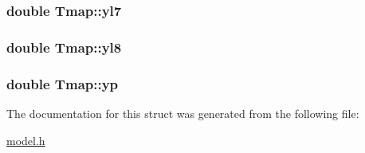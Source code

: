 \subsubsection[{\texorpdfstring{yl7}{yl7}}]{\setlength{\rightskip}{0pt plus 5cm}double Tmap\+::yl7}\hypertarget{struct_tmap_a096b97170b08fa99f2692695a6775e35}{}\label{struct_tmap_a096b97170b08fa99f2692695a6775e35}
\subsubsection[{\texorpdfstring{yl8}{yl8}}]{\setlength{\rightskip}{0pt plus 5cm}double Tmap\+::yl8}\hypertarget{struct_tmap_aedd27b113a1e4f091ccbba9c6d8c3237}{}\label{struct_tmap_aedd27b113a1e4f091ccbba9c6d8c3237}
\subsubsection[{\texorpdfstring{yp}{yp}}]{\setlength{\rightskip}{0pt plus 5cm}double Tmap\+::yp}\hypertarget{struct_tmap_a060ab599d7d4310c5df62d84fcb8479a}{}\label{struct_tmap_a060ab599d7d4310c5df62d84fcb8479a}


The documentation for this struct was generated from the following file\+:\begin{DoxyCompactItemize}
\item 
\hyperlink{model_8h}{model.\+h}\end{DoxyCompactItemize}

